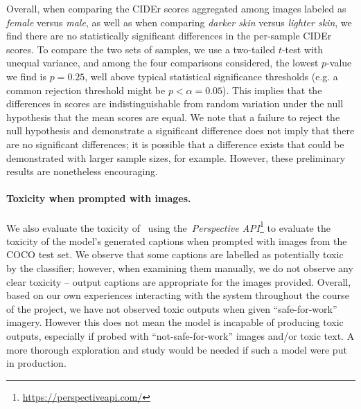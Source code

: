 Overall, when comparing the CIDEr scores aggregated among images labeled as \textit{female} versus \textit{male}, as well as when comparing \textit{darker skin} versus \textit{lighter skin}, we find there are no statistically significant differences in the per-sample CIDEr scores.
To compare the two sets of samples, we use a two-tailed $t$-test with unequal variance, and among the four comparisons considered, the lowest $p$-value we find is $p=0.25$, well above typical statistical significance thresholds (e.g. a common rejection threshold might be $p < \alpha = 0.05$).
This implies that the differences in scores are indistinguishable from random variation under the null hypothesis that the mean scores are equal.
We note that a failure to reject the null hypothesis and demonstrate a significant difference does not imply that there are no significant differences; it is possible that a difference exists that could be demonstrated with larger sample sizes, for example.
However, these preliminary results are nonetheless encouraging.

\paragraph{Toxicity when prompted with images.}
We also evaluate the toxicity of~\largem{} using the~\emph{Perspective API}\footnote{ \url{https://perspectiveapi.com/}} to evaluate the toxicity of the model's generated captions when prompted with images from the COCO test set.
We observe that some captions are labelled as potentially toxic by the classifier;
however, when examining them manually, we do not observe any clear toxicity -- output captions are appropriate for the images provided.
Overall, based on our own experiences interacting with the system throughout the course of the project, we have not observed toxic outputs when given ``safe-for-work'' imagery.
However this does not mean the model is incapable of producing toxic outputs, especially if probed with ``not-safe-for-work'' images and/or toxic text.
A more thorough exploration and study would be needed if such a model were put in production.

